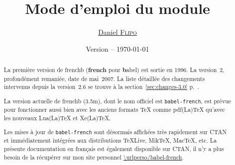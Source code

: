 \documentclass[a4paper,12pt,german,english,french]{article}
\title{Mode d’emploi du module \ext{babel-french}}
\author{\href{mailto:daniel.flipo@free.fr}{Daniel \textsc{Flipo}}}
\date{Version {\latestversion} -- \today}
\def\ColorVerb{\color{MidnightBlue}}
\newcommand*{\ext}[1]{\texttt{\ColorVerb #1}}
\newcommand*{\latestversion}{3.5m}
\begin{document}

\maketitle
\thispagestyle{empty}

\begin{abstract}
  La première version de frenchb (\textbf{french} pour \textbf{b}abel) est
  sortie en 1996.  La version~2, profondément remaniée, date de mai~2007.
  La liste détaillée des changements intervenus depuis la version~2.6 se
  trouve à la section~\ref{sec:changes-3.0} p.~\pageref{sec:changes-3.0}.

  La version actuelle de frenchb (\latestversion), dont le nom officiel est
  \ext{babel-french}, est prévue pour fonctionner aussi bien avec les anciens
  formats TeX comme pdf(La)TeX qu’avec les nouveaux Lua(La)TeX et Xe(La)TeX.

  Les mises à jour de \ext{babel-french} sont désormais affichées très
  rapidement sur CTAN et immédiatement intégrées aux distributions TeXLive,
  MikTeX, MacTeX, etc.
  La présente documentation en français est également disponible sur CTAN,
  il n’y a plus besoin de la récupérer sur mon site
  personnel {\expandafter\expandafter\expandafter\url{\urlperso/babel-french}}.

\end{abstract}
\end{document}
